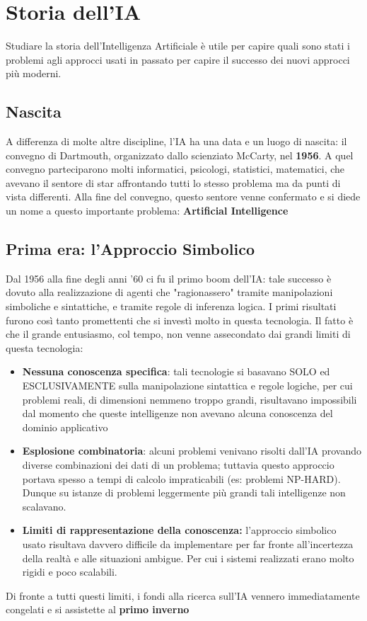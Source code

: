 \section{Storia dell'IA}
Studiare la storia dell'Intelligenza Artificiale è utile per capire quali sono stati i 
problemi agli approcci usati in passato per capire il successo dei nuovi approcci più moderni.
\subsection{Nascita}
A differenza di molte altre discipline, l'IA ha una data e un luogo di nascita: il convegno di Dartmouth, organizzato dallo scienziato McCarty, 
nel \textbf{1956}. A quel convegno parteciparono molti informatici, psicologi, statistici, matematici, che avevano il sentore di star affrontando tutti lo stesso problema ma da punti di vista differenti.
Alla fine del convegno, questo sentore venne confermato e si diede un nome a questo importante problema: \textbf{Artificial Intelligence}

\subsection{Prima era: l'Approccio Simbolico}
Dal 1956 alla fine degli anni '60 ci fu il primo boom dell'IA: tale successo è dovuto alla realizzazione di agenti che "ragionassero" tramite manipolazioni simboliche e sintattiche, e tramite regole di inferenza logica.
I primi risultati furono così tanto promettenti che si investì molto in questa tecnologia. Il fatto è che il grande entusiasmo, col tempo, non venne assecondato dai grandi limiti di questa tecnologia:
\begin{itemize}
    \item \textbf{Nessuna conoscenza specifica}: tali tecnologie si basavano SOLO ed ESCLUSIVAMENTE sulla manipolazione sintattica e regole logiche, per cui problemi reali, 
    di dimensioni nemmeno troppo grandi, risultavano impossibili dal momento che queste intelligenze non avevano alcuna conoscenza del
    dominio applicativo
    \item \textbf{Esplosione combinatoria}: alcuni problemi venivano risolti dall'IA provando diverse combinazioni dei dati di un problema;
    tuttavia questo approccio portava spesso a tempi di calcolo impraticabili (es: problemi NP-HARD). Dunque su istanze di problemi leggermente più grandi
    tali intelligenze non scalavano.
    \item \textbf{Limiti di rappresentazione della conoscenza:} l'approccio simbolico usato risultava davvero difficile da implementare
    per far fronte all'incertezza della realtà e alle situazioni ambigue. Per cui i sistemi realizzati erano molto rigidi e poco scalabili.
\end{itemize}
Di fronte a tutti questi limiti, i fondi alla ricerca sull'IA vennero immediatamente congelati e si assistette al \textbf{primo inverno}

